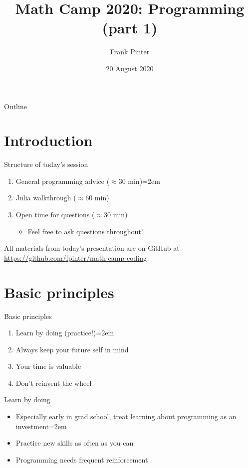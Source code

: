 \documentclass[handout]{beamer}
\title{Math Camp 2020: Programming (part 1)}
\author{Frank Pinter}
\date{20 August 2020}
\begin{document}
\begin{frame}
  \titlepage
\end{frame}

\begin{frame}{Outline}
  \tableofcontents
\end{frame}

\section*{Introduction}

\begin{frame}{Structure of today's session}
\begin{enumerate}
    \item General programming advice ($\approx 30$ min)\itemsep=2em
    \item Julia walkthrough ($\approx 60$ min)
    \item Open time for questions ($\approx 30$ min)
    \begin{itemize}
        \item Feel free to ask questions throughout!
    \end{itemize}
\end{enumerate}
\vspace{0.5in}
All materials from today's presentation are on GitHub at \\
\url{https://github.com/fpinter/math-camp-coding}
\end{frame}

\section{Basic principles}

\begin{frame}{Basic principles}
    \begin{enumerate}
        \item Learn by doing (practice!)\itemsep=2em
        \item Always keep your future self in mind
        \item Your time is valuable
        \item Don't reinvent the wheel
    \end{enumerate}
\end{frame}

\begin{frame}{Learn by doing}
    \begin{itemize}
        \item Especially early in grad school, treat learning about programming as an investment\itemsep=2em
        \item Practice new skills as often as you can
        \item Programming needs frequent reinforcement
    \end{itemize}
\end{frame}
\end{document}
